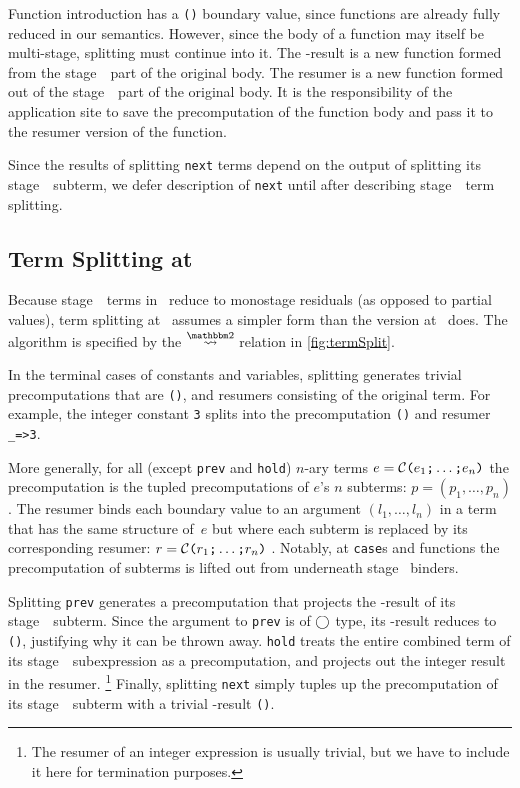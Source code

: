 \begin{abstrsyn}
Function introduction has a \texttt{()} boundary value,
since functions are already fully reduced in our semantics.
However, since the body of a function may itself be multi-stage, splitting must continue into it.
The \bbone-result is a new function formed from the stage~\bbone\ part of the original body.
The resumer is a new function formed out of the stage~\bbtwo\ part of the original body.
It is the responsibility of the application site to save the precomputation of the function body
and pass it to the resumer version of the function.

Since the results of splitting \texttt{next} terms depend on the output of splitting its stage~\bbtwo\ subterm,
we defer description of \texttt{next} until after describing stage~\bbtwo\ term splitting.

\subsection{Term Splitting at \bbtwo}

Because stage~\bbtwo\ terms in \lang\ reduce to monostage residuals (as opposed to partial values),
term splitting at \bbtwo\ assumes a simpler form than the version at \bbonem\ does. 
The algorithm is specified by the $\splittwosym$ relation in \cref{fig:termSplit}.

In the terminal cases of
constants and variables, splitting generates trivial precomputations that are \texttt{()}, and resumers consisting of the original term.
For example, the integer constant \texttt{3} splits into the
precomputation \texttt{()} and resumer \texttt{\_=>3}.

More generally, for all (except \texttt{prev} and \texttt{hold}) 
$n$-ary terms $e = \mathcal{C}\texttt{(} e_1 \texttt{;} \ldots \texttt{;} e_n \texttt{)}$ 
the precomputation is the tupled precomputations of $e$'s $n$ subterms:
$p=(p_1,\ldots,p_n)$.  The resumer binds each boundary value to an
argument $(l_1,\ldots,l_n)$ in a term that has the same structure
of~$e$ but where each subterm is replaced by its corresponding resumer:
$r = \mathcal{C}\texttt{(} r_1 \texttt{;} \ldots \texttt{;} r_n \texttt{)}$ .
Notably, at \texttt{case}s and functions the
precomputation of subterms is lifted out from underneath stage \bbtwo\ binders.  

Splitting \texttt{prev} generates a precomputation that projects the \bbone-result of its stage~\bbone\ subterm.
Since the argument to \texttt{prev} is of $\bigcirc$ type, its \bbone-result reduces to \texttt{()}, justifying why it can be thrown away.
\texttt{hold} treats the entire combined term of its stage~\bbone\ subexpression as a precomputation, 
and projects out the integer result in the resumer. 
\footnote{The resumer of an integer expression is usually trivial, 
but we have to include it here for termination purposes.} 
Finally, splitting \texttt{next} simply tuples up the precomputation of its stage~\bbtwo\ subterm with a trivial \bbone-result \texttt{()}.


\end{abstrsyn}
